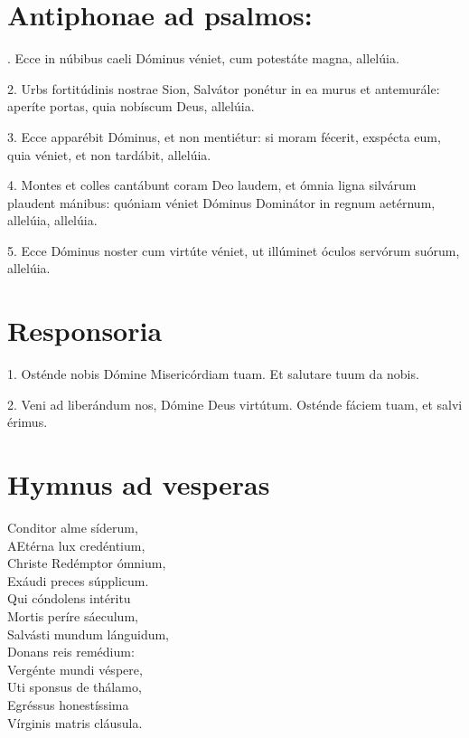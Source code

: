 \documentclass[a4paper, twoside, 12pt]{article}
\begin{document}
\section{Antiphonae ad psalmos:}

. Ecce in núbibus caeli Dóminus véniet,
cum potestáte magna, allelúia.

2. Urbs fortitúdinis nostrae Sion,
Salvátor ponétur in ea murus et antemurále:
aperíte portas,
quia nobíscum Deus, allelúia.

3. Ecce apparébit Dóminus,
et non mentiétur:
si moram fécerit, exspécta eum, 
quia véniet, et non tardábit, allelúia.

4. Montes et colles cantábunt coram Deo laudem,
et ómnia ligna silvárum plaudent mánibus:
quóniam véniet Dóminus Dominátor in regnum aetérnum, allelúia, allelúia.

5. Ecce Dóminus noster cum virtúte véniet,
ut illúminet óculos servórum suórum, allelúia.

\section{Responsoria}

1. Osténde nobis Dómine Misericórdiam tuam.
Et salutare tuum da nobis.

2. Veni ad liberándum nos, Dómine Deus virtútum.
Osténde fáciem tuam, et salvi érimus.

\section{Hymnus ad vesperas}

Conditor alme síderum,\\
AEtérna lux credéntium,\\
Christe  Redémptor ómnium,\\
Exáudi preces súpplicum.\\	

Qui cóndolens intéritu\\
Mortis períre sáeculum,\\
Salvásti mundum lánguidum,\\
Donans reis remédium:\\ 	

Vergénte mundi véspere,\\
Uti sponsus de thálamo,\\
Egréssus honestíssima\\
Vírginis matris cláusula.\\ 	
\end{document}

